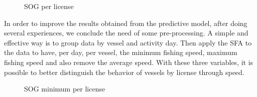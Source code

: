 \begin{figure}[H]
\centering
{}
\caption{SOG per license}
\label{fig:sogall}
\end{figure}

In order to improve the results obtained from the predictive model, after doing several experiences, we conclude the need of some pre-processing. A simple and effective way is to group data by vessel and activity day. Then apply the SFA to the data to have, per day, per vessel, the minimum fishing speed, maximum fishing speed and also remove the average speed.
With these three variables, it is possible to better distinguish the behavior of vessels by license through speed.

\begin{figure}
\centering
{}
\caption{SOG minimum per license}
\label{fig:sogminall}
\end{figure}


